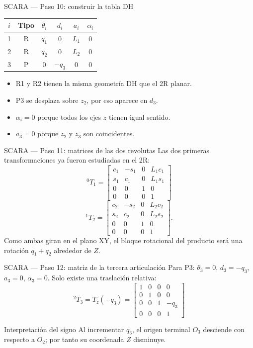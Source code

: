 \documentclass[aspectratio=169,11pt]{beamer}
\begin{document}
\begin{frame}[t]{SCARA — Paso 10: construir la tabla DH}
 \small
 \begin{tabular}{c|c|cccc}
 \toprule
 $i$ & Tipo & $\theta_i$ & $d_i$ & $a_i$ & $\alpha_i$\\\midrule
 1 & R & $q_1$ & $0$ & $L_1$ & $0$\\
 2 & R & $q_2$ & $0$ & $L_2$ & $0$\\
 3 & P & $0$ & $-q_3$ & $0$ & $0$\\
 \bottomrule
 \end{tabular}
 \pause
 \begin{itemize}
  \item R1 y R2 tienen la misma geometría DH que el 2R planar.
  \item P3 se desplaza sobre $z_2$, por eso aparece en $d_3$.
  \item $\alpha_i=0$ porque todos los ejes $z$ tienen igual sentido.
  \item $a_3=0$ porque $z_2$ y $z_3$ son coincidentes.
 \end{itemize}
\end{frame}

\begin{frame}[t]{SCARA — Paso 11: matrices de las dos revolutas}
 \small
 Las dos primeras transformaciones ya fueron estudiadas en el 2R:
 \[
 {}^0T_1=\begin{bmatrix}
 c_1&-s_1&0&L_1c_1\\s_1&c_1&0&L_1s_1\\
 0&0&1&0\\0&0&0&1
 \end{bmatrix}
 \]
 \[
 {}^1T_2=\begin{bmatrix}
 c_2&-s_2&0&L_2c_2\\s_2&c_2&0&L_2s_2\\
 0&0&1&0\\0&0&0&1
 \end{bmatrix}.
 \]
 \small Como ambas giran en el plano XY, el bloque rotacional
 del producto será una rotación $q_1+q_2$ alrededor de $Z$.
\end{frame}

\begin{frame}[t]{SCARA — Paso 12: matriz de la tercera articulación}
 \small
 Para P3: $\theta_3=0$, $d_3=-q_3$, $a_3=0$,
 $\alpha_3=0$. Solo existe una traslación relativa:
 \[
 \boxed{{}^2T_3=T_z(-q_3)=\begin{bmatrix}
 1&0&0&0\\
 0&1&0&0\\
 0&0&1&-q_3\\
 0&0&0&1
 \end{bmatrix}}
 \]
 \pause
 \begin{block}{Interpretación del signo}
 Al incrementar $q_3$, el origen terminal $O_3$ desciende
 con respecto a $O_2$; por tanto su coordenada $Z$ disminuye.
 \end{block}
\end{frame}
\end{document}
